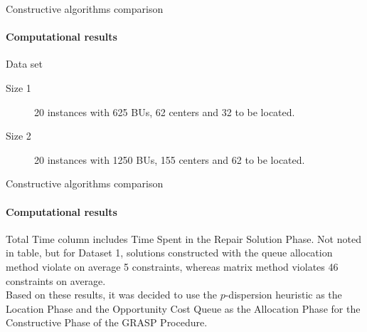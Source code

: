 \documentclass{beamer}
\begin{document}
\begin{frame}{Constructive algorithms comparison}
    \framesubtitle{Computational results}

    \begin{block}{Data set}
        \begin{description}
            \item[Size 1] 20 instances with 625 BUs, 62 centers and 32 to be located.
            \item[Size 2] 20 instances with 1250 BUs, 155 centers and 62 to be located.
        \end{description}
    \end{block}
\end{frame}

\begin{frame}{Constructive algorithms comparison}
    \framesubtitle{Computational results}
\begin{table}
    \centering
    \caption{Constructive Heuristics Comparison of Averages.}
    \label{:comp}
\end{table}
    Total Time column includes Time Spent in the Repair Solution Phase. Not noted in table, but for Dataset 1, solutions constructed with the queue allocation method violate on average 5 constraints, whereas matrix method violates 46 constraints on average.
    \\
    Based on these results, it was decided to use the $p$-dispersion heuristic as the Location Phase and the Opportunity Cost Queue as the Allocation Phase for the Constructive Phase of the GRASP Procedure.
\end{frame}
\end{document}
